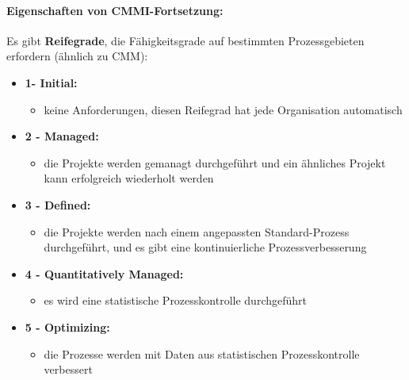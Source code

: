 \paragraph{Eigenschaften von CMMI-Fortsetzung:}
Es gibt \textbf{Reifegrade}, die Fähigkeitsgrade auf bestimmten Prozessgebieten erfordern (ähnlich zu CMM):
\begin{itemize}
	\item \textbf{1- Initial:} 
	\begin{itemize}
		\item keine Anforderungen, diesen Reifegrad hat jede Organisation automatisch
	\end{itemize}
	\item \textbf{2 - Managed:} 
	\begin{itemize}
		\item die Projekte werden gemanagt durchgeführt und ein ähnliches Projekt kann erfolgreich wiederholt werden
	\end{itemize}
	\item \textbf{3 - Defined:} 
	\begin{itemize}
		\item die Projekte werden nach einem angepassten Standard-Prozess durchgeführt, und es gibt eine kontinuierliche Prozessverbesserung
	\end{itemize}
	\item \textbf{4 - Quantitatively Managed:} 
	\begin{itemize}
		\item es wird eine statistische Prozesskontrolle durchgeführt
	\end{itemize}
	\item \textbf{5 - Optimizing:} 
	\begin{itemize}
		\item die Prozesse werden mit Daten aus statistischen Prozesskontrolle verbessert
	\end{itemize}
\end{itemize}

